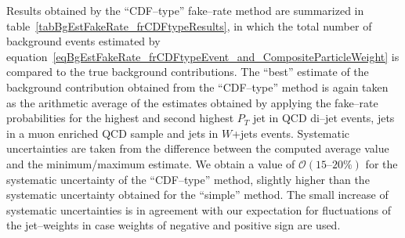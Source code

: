 Results obtained by the ``CDF--type'' fake--rate method
are summarized in table~\ref{tabBgEstFakeRate_frCDFtypeResults},
in which the total number of background events 
estimated by equation~\ref{eqBgEstFakeRate_frCDFtypeEvent_and_CompositeParticleWeight}
is compared to the true background contributions.
The ``best'' estimate of the background contribution obtained from the ``CDF--type'' method
is again taken as the arithmetic average of the estimates
obtained by applying the fake--rate probabilities for the highest and second highest $P_{T}$ jet
in QCD di--jet events, jets in a muon enriched QCD sample and jets in $W$+jets events.
Systematic uncertainties are taken from the difference between the computed average value
and the minimum/maximum estimate.
We obtain a value of $\mathcal{O} \left( 15 \mbox{--} 20 \% \right)$ for the systematic uncertainty
of the ``CDF--type'' method, slightly higher than the systematic uncertainty obtained for the ``simple'' method.
The small increase of systematic uncertainties is in agreement with our expectation
for fluctuations of the jet--weights in case weights of negative and positive sign are used.

